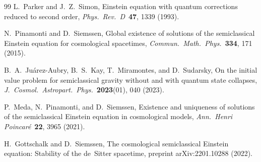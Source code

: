 \documentclass[12pt,a4paper]{article}
\begin{document}
\begin{thebibliography}{99}
 L.~Parker and J.~Z.~Simon, Einstein equation with quantum
corrections reduced to second order, \textit{Phys.\ Rev.\ D}\ \textbf{47}, 1339 (1993).

 N.~Pinamonti and D.~Siemssen, Global existence of solutions
of the semiclassical Einstein equation for cosmological spacetimes,
\textit{Commun.\ Math.\ Phys.}\ \textbf{334}, 171 (2015).

 B.~A.~Ju\'arez-Aubry, B.~S.~Kay, T.~Miramontes, and D.~Sudarsky,
On the initial value problem for semiclassical gravity without and with quantum state
collapses, \textit{J.\ Cosmol.\ Astropart.\ Phys.}\ \textbf{2023}(01), 040 (2023).

 P.~Meda, N.~Pinamonti, and D.~Siemssen,
Existence and uniqueness of solutions of the semiclassical Einstein equation in
cosmological models, \textit{Ann.\ Henri Poincar\'e}\ \textbf{22}, 3965 (2021).

 H.~Gottschalk and D.~Siemssen,
The cosmological semiclassical Einstein equation: Stability of the de~Sitter
spacetime, preprint arXiv:2201.10288 (2022).

\end{thebibliography}
\end{document}
